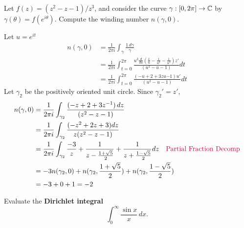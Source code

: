 \documentclass{homework}
\begin{document}
                        \begin{problem}
                          Let $f(z) = (z^2-z-1)/z^3$, and consider the curve
                            $\gamma : [0,2\pi] \to \mathbb{C}$ by $\gamma(\theta) = f(e^{i\theta})$.
                              Compute the winding number $n(\gamma,0)$.
                              \end{problem}
                              \begin{solution}
                              Let $u=e^{it}$
                              \begin{align*}
                                  n(\gamma, 0) &= \frac{1}{2\pi i}\int_\gamma \frac{1\, d\gamma}{\gamma}\\
                                      &= \frac{1}{2\pi i}\int_{t=0}^{2\pi} \frac{u^3\frac{d}{du}(\frac{1}{u} - \frac{1}{u^2} - \frac{1}{u^3})z'}{(u^2-u-1)}dt\\
                                          &= \frac{1}{2\pi i}\int_{t=0}^{2\pi} \frac{(-u + 2 + 3zu{-1})u'}{(u^2-u-1)}dt
                                          \end{align*}
                                          Let $\gamma_2$ be the positively oriented unit circle. Since $\gamma_2' = z'$, 
                                          \begin{align*}
                                              n(\gamma, 0) &= \frac{1}{2\pi i}\int_{\gamma_2} \frac{(-z + 2 + 3z^{-1})\, dz}{(z^2-z-1)}\\
                                                  &= \frac{1}{2\pi i}\int_{\gamma_2} \frac{(-z^2 + 2z + 3)dz}{z(z^2-z-1)}\\
                                                      &= \frac{1}{2\pi i}\int_{\gamma_2} \frac{-3}{z} + \frac{1}{z - \frac{1+\sqrt{5}}{2}} + \frac{1}{z + \frac{1-\sqrt{5}}{2}}dz \quad\color{purple} \text{Partial Fraction Decomp}\\
                                                          &= -3n(\gamma_2, 0) + n(\gamma_2,\frac{1+\sqrt{5}}{2}) + n(\gamma_2, \frac{1-\sqrt{5}}{2})\\
                                                              &= -3 + 0 + 1 = -2
                                                              \end{align*}
                                                              \end{solution}
                                                              \begin{problem}
                                                                Evaluate the \textbf{Dirichlet integral}
                                                                  \[
                                                                      \int_0^\infty \frac{\sin x}{x} \, dx.
                                                                        \]
                                                                        \end{problem}
\end{document}
